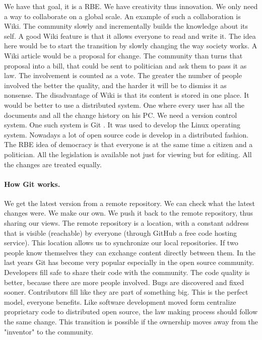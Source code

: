 \documentclass{article}
\begin{document}
We have that goal, it is a RBE.
We have creativity thus innovation.
We only need a way to collaborate on a global scale.
An example of such a collaboration is Wiki.
The community slowly and incrementally builds the knowledge about its self.
A good Wiki feature is that it allows everyone to read and write it.
The idea here would be to start the transition by slowly changing the way society works.
A Wiki article would be a proposal for change.
The community than turns that proposal into a bill, that could be sent to politician and ask them to pass it as law.
The involvement is counted as a vote.
The greater the number of people involved the better the quality, and the harder it will be to dismiss it as nonsense.
The disadvantage of Wiki is that its content is stored in one place.
It would be better to use a distributed system.
One where every user has all the documents and all the change history on his PC.
We need a version control system.
One such system is Git \cite{git}.
It was used to develop the Linux operating system.
Nowadays a lot of open source code is develop in a distributed fashion.
The RBE idea of democracy is that everyone is at the same time a citizen and a politician.
All the legislation is available not just for viewing but for editing.
All the changes are treated equally.

\paragraph{How Git works.}
We get the latest version from a remote repository.
We can check what the latest changes were.
We make our own.
We push it back to the remote repository, thus sharing our views.
The remote repository is a location, with a constant address that is visible (reachable) by everyone (through GitHub \cite{github} a free code hosting service).
This location allows us to synchronize our local repositories.
If two people know themselves they can exchange content directly between them.
In the last years Git has become very popular especially in the open source community.
Developers fill safe to share their code with the community.
The code quality is better, because there are more people involved.
Bugs are discovered and fixed sooner.
Contributors fill like they are part of something big.
This is the perfect model, everyone benefits.
Like software development moved form centralize proprietary code to distributed open source, the law making process should follow the same change.
This transition is possible if the ownership moves away from the "inventor" to the community.
\end{document}
